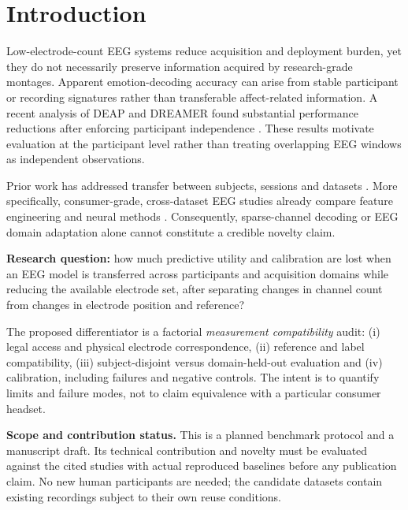 \section{Introduction}
Low-electrode-count EEG systems reduce acquisition and deployment burden, yet they do not necessarily preserve information acquired by research-grade montages. Apparent emotion-decoding accuracy can arise from stable participant or recording signatures rather than transferable affect-related information. A recent analysis of DEAP and DREAMER found substantial performance reductions after enforcing participant independence \cite{pandilova2026}. These results motivate evaluation at the participant level rather than treating overlapping EEG windows as independent observations.

Prior work has addressed transfer between subjects, sessions and datasets \cite{review2024,crossadapt2025}. More specifically, consumer-grade, cross-dataset EEG studies already compare feature engineering and neural methods \cite{consumer2025}. Consequently, sparse-channel decoding or EEG domain adaptation alone cannot constitute a credible novelty claim.

\textbf{Research question:} how much predictive utility and calibration are lost when an EEG model is transferred across participants and acquisition domains while reducing the available electrode set, after separating changes in channel count from changes in electrode position and reference?

The proposed differentiator is a factorial \emph{measurement compatibility} audit: (i) legal access and physical electrode correspondence, (ii) reference and label compatibility, (iii) subject-disjoint versus domain-held-out evaluation and (iv) calibration, including failures and negative controls. The intent is to quantify limits and failure modes, not to claim equivalence with a particular consumer headset.

\textbf{Scope and contribution status.} This is a planned benchmark protocol and a manuscript draft. Its technical contribution and novelty must be evaluated against the cited studies with actual reproduced baselines before any publication claim. No new human participants are needed; the candidate datasets contain existing recordings subject to their own reuse conditions.
